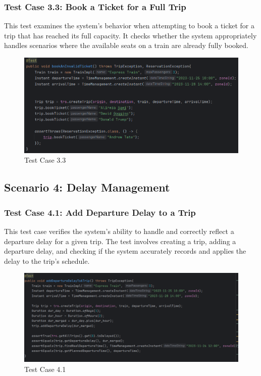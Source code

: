 \documentclass{article}
\begin{document}
\pagebreak

\subsubsection{Test Case 3.3: Book a Ticket for a Full Trip}

This test examines the system's behavior when attempting to book a ticket for a trip that has reached its full capacity. It checks whether the system appropriately handles scenarios where the available seats on a train are already fully booked.

\begin{figure}[h]
  \centering
  \includegraphics[width=1.0\textwidth]{pictures/T3-3.png}
  \caption{Test Case 3.3}
  \label{fig:your_label}
\end{figure}

\pagebreak

\subsection{Scenario 4: Delay Management}
\subsubsection{Test Case 4.1: Add Departure Delay to a Trip}

This test case verifies the system's ability to handle and correctly reflect a departure delay for a given trip. The test involves creating a trip, adding a departure delay, and checking if the system accurately records and applies the delay to the trip's schedule.

\begin{figure}[h]
  \centering
  \includegraphics[width=1.0\textwidth]{pictures/T4-1.png}
  \caption{Test Case 4.1}
  \label{fig:your_label}
\end{figure}
\end{document}
